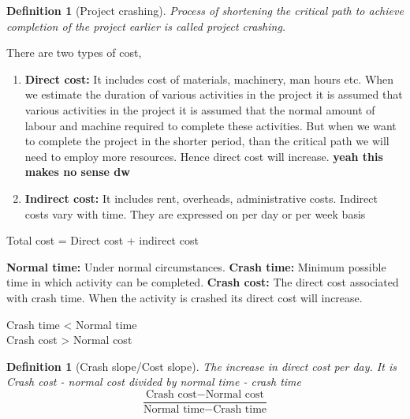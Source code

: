 \documentclass[oneside,11pt,pdftex]{book}%
\numberwithin{equation}{section}
\newtheorem{definition}[theorem]{Definition}
\numberwithin{section}{chapter}
\numberwithin{equation}{chapter}
\begin{document}
\begin{definition}[Project crashing]
	Process of shortening the critical path to achieve completion of the project earlier is called project crashing.
\end{definition}
There are two types of cost,
\begin{enumerate}
	\item \textbf{ Direct cost: } It includes cost of materials, machinery, man hours etc. When we estimate the duration of various activities in the project it is assumed that various activities in the project it is assumed that the normal amount of labour and machine required to complete these activities. But when we want to complete the project in the shorter period, than the critical path we will need to employ more resources. Hence direct cost will increase. \textbf{yeah this makes no sense dw}
	\item\textbf{ Indirect cost: } It includes rent, overheads, administrative costs. Indirect costs vary with time. They are expressed on per day or per week basis
\end{enumerate}

Total cost = Direct cost + indirect cost

\textbf{Normal time: }Under normal circumstances.
\textbf{Crash time: }Minimum possible time in which activity can be completed.
\textbf{Crash cost: }The direct cost associated with crash time. When the activity is crashed its direct cost will increase.

Crash time < Normal time\\
Crash cost > Normal cost

\begin{definition}[Crash slope/Cost slope]
	The increase in direct cost per day. It is Crash cost - normal cost divided by normal time - crash time
	\[ \frac{\text{Crash cost}-\text{Normal cost}}{\text{Normal time}-\text{Crash time}} \]
\end{definition}
\end{document}
